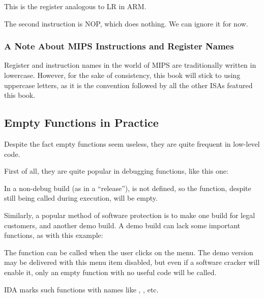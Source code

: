 This is the register analogous to \ac{LR} in ARM.

The second instruction is \ac{NOP}, which does nothing.
We can ignore it for now.

\subsubsection{A Note About MIPS Instructions and Register Names}

Register and instruction names in the world of MIPS are traditionally written in lowercase.
However, for the sake of consistency, this book will stick to using uppercase letters,
as it is the convention followed by all the other \ac{ISA}s featured this book.

\subsection{Empty Functions in Practice}

Despite the fact empty functions seem useless, they are quite frequent in low-level code.

First of all, they are quite popular in debugging functions, like this one:



In a non-debug build (as in a ``release''),  is not defined,
so the  function, despite still being called during execution,
will be empty.

Similarly, a popular method of software protection is to make one build for legal customers, and another demo build.
A demo build can lack some important functions, as with this example:



The  function can be called when the user clicks  on the menu.
The demo version may be delivered with this menu item disabled, but even if a software cracker will enable it,
only an empty function with no useful code will be called.

IDA marks such functions with names like , , etc.

